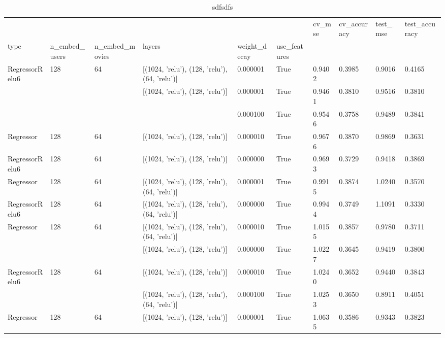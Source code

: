 \begin{table}
\centering
\caption{sdfsdfs}
\label{tab:results.nn}
\begin{tabular}{llllllllll}
\toprule
           &     &    &                                 &          &       &  cv\_mse & cv\_accuracy & test\_mse & test\_accuracy \\
type & n\_embed\_users & n\_embed\_movies & layers & weight\_decay & use\_features &         &             &          &               \\
\midrule
RegressorRelu6 & 128 & 64 & [(1024, 'relu'), (128, 'relu'), (64, 'relu')] & 0.000001 & True  &  0.9402 &      0.3985 &   0.9016 &        0.4165 \\
           &     &    & [(1024, 'relu'), (128, 'relu')] & 0.000001 & True  &  0.9461 &      0.3810 &   0.9516 &        0.3810 \\
           &     &    &                                 & 0.000100 & True  &  0.9546 &      0.3758 &   0.9489 &        0.3841 \\
Regressor & 128 & 64 & [(1024, 'relu'), (128, 'relu')] & 0.000010 & True  &  0.9676 &      0.3870 &   0.9869 &        0.3631 \\
RegressorRelu6 & 128 & 64 & [(1024, 'relu'), (128, 'relu')] & 0.000000 & True  &  0.9693 &      0.3729 &   0.9418 &        0.3869 \\
Regressor & 128 & 64 & [(1024, 'relu'), (128, 'relu'), (64, 'relu')] & 0.000001 & True  &  0.9915 &      0.3874 &   1.0240 &        0.3570 \\
RegressorRelu6 & 128 & 64 & [(1024, 'relu'), (128, 'relu'), (64, 'relu')] & 0.000000 & True  &  0.9944 &      0.3749 &   1.1091 &        0.3330 \\
Regressor & 128 & 64 & [(1024, 'relu'), (128, 'relu'), (64, 'relu')] & 0.000010 & True  &  1.0155 &      0.3857 &   0.9780 &        0.3711 \\
           &     &    & [(1024, 'relu'), (128, 'relu')] & 0.000000 & True  &  1.0227 &      0.3645 &   0.9419 &        0.3800 \\
RegressorRelu6 & 128 & 64 & [(1024, 'relu'), (128, 'relu')] & 0.000010 & True  &  1.0240 &      0.3652 &   0.9440 &        0.3843 \\
           &     &    & [(1024, 'relu'), (128, 'relu'), (64, 'relu')] & 0.000100 & True  &  1.0253 &      0.3650 &   0.8911 &        0.4051 \\
Regressor & 128 & 64 & [(1024, 'relu'), (128, 'relu')] & 0.000001 & True  &  1.0635 &      0.3586 &   0.9343 &        0.3823 \\

\end{tabular}
\end{table}
